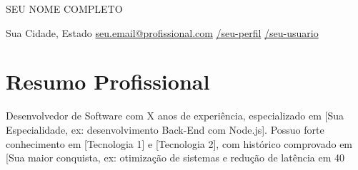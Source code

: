 \documentclass[a4paper,11pt]{article}
\begin{document}

\begin{center}
    {\Huge \scshape SEU NOME COMPLETO} %
    \vspace{6pt}

    \small
     Sua Cidade, Estado \quad%
    \href{mailto:seu.email@profissional.com}{ seu.email@profissional.com} \quad%
    \href{https://www.linkedin.com/in/seu-perfil}{ /seu-perfil} \quad%
    \href{https://github.com/seu-usuario}{ /seu-usuario}
\end{center}


\section{Resumo Profissional}
\vspace{2pt}
Desenvolvedor de Software com X anos de experiência, especializado em [Sua Especialidade, ex: desenvolvimento Back-End com Node.js]. Possuo forte conhecimento em [Tecnologia 1] e [Tecnologia 2], com histórico comprovado em [Sua maior conquista, ex: otimização de sistemas e redução de latência em 40%

\end{document}
